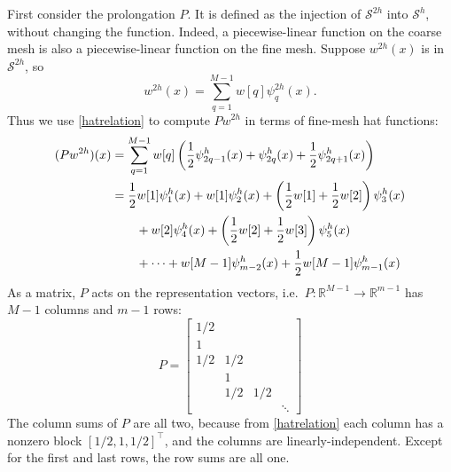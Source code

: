 \documentclass[letterpaper,final,12pt,reqno]{amsart}
\newcommand{\RR}{\mathbb{R}}
\begin{document}
First consider the prolongation $P$.  It is defined as the injection of $\mathcal{S}^{2h}$ into $\mathcal{S}^h$, without changing the function.  Indeed, a piecewise-linear function on the coarse mesh is also a piecewise-linear function on the fine mesh.  Suppose $w^{2h}(x)$ is in $\mathcal{S}^{2h}$, so
    $$w^{2h}(x) = \sum_{q=1}^{M-1} w[q] \psi_q^{2h}(x).$$
Thus we use \eqref{hatrelation} to compute $P w^{2h}$ in terms of fine-mesh hat functions:
\begin{align}
(P w^{2h})(x) &= \sum_{q=1}^{M-1} w[q] \left(\frac{1}{2} \psi_{2q-1}^h(x) + \psi_{2q}^h(x) + \frac{1}{2} \psi_{2q+1}^h(x)\right) \label{pformula} \\
              &= \frac{1}{2} w[1] \psi_1^h(x) + w[1] \psi_2^h(x) + \left(\frac{1}{2} w[1] + \frac{1}{2} w[2]\right) \psi_3^h(x) \notag \\
              &\qquad + w[2] \psi_4^h(x) + \left(\frac{1}{2} w[2] + \frac{1}{2} w[3]\right) \psi_5^h(x) \notag \\
              &\qquad + \dots + w[M-1] \psi_{m-2}^h(x) + \frac{1}{2} w[M-1] \psi_{m-1}^h(x) \notag
\end{align}
As a matrix, $P$ acts on the representation vectors, i.e.~$P:\RR^{M-1} \to \RR^{m-1}$ has $M-1$ columns and $m-1$ rows:
\begin{equation}
P = \begin{bmatrix}
1/2 & & & \\
1 & & & \\
1/2 & 1/2 & & \\
 & 1 & & \\
 & 1/2 & 1/2 & \\
 & & & \ddots
\end{bmatrix} \label{pmatrix}
\end{equation}
The column sums of $P$ are all two, because from \eqref{hatrelation} each column has a nonzero block $[1/2,1,1/2]^\top$, and the columns are linearly-independent.  Except for the first and last rows, the row sums are all one.
\end{document}
